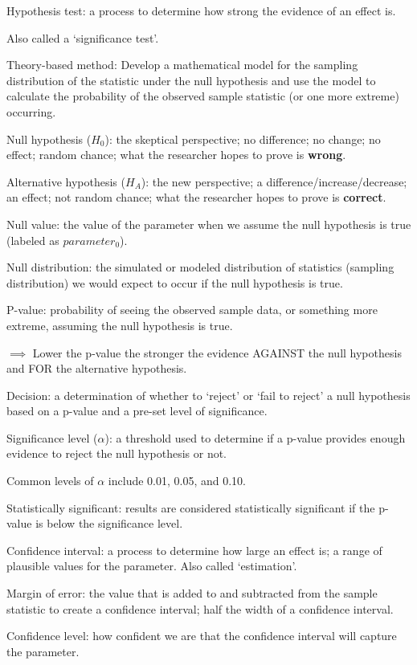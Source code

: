 \documentclass[
]{report}
\newcommand{\rgi}{\hspace{24pt}}  %
\begin{document}
Hypothesis test: a process to determine how strong the evidence of an effect is.

\rgi Also called a `significance test'.

Theory-based method: Develop a mathematical model for the sampling distribution of the statistic under the null hypothesis and use the model to calculate the probability of the observed sample statistic (or one more extreme) occurring.

Null hypothesis (\(H_0\)): the skeptical perspective; no difference; no change; no effect; random chance; what the researcher hopes to prove is \textbf{wrong}.

Alternative hypothesis (\(H_A\)): the new perspective; a difference/increase/decrease; an effect; not random chance; what the researcher hopes to prove is \textbf{correct}.

Null value: the value of the parameter when we assume the null hypothesis is true (labeled as \(parameter_0\)).

Null distribution: the simulated or modeled distribution of statistics (sampling distribution) we would expect to occur if the null hypothesis is true.

P-value: probability of seeing the observed sample data, or something more extreme, assuming the null hypothesis is true.

\(\implies\) Lower the p-value the stronger the evidence AGAINST the null hypothesis and FOR the alternative hypothesis.

Decision: a determination of whether to `reject' or `fail to reject' a null hypothesis based on a p-value and a pre-set level of significance.

Significance level (\(\alpha\)): a threshold used to determine if a p-value provides enough evidence to reject the null hypothesis or not.

\rgi Common levels of \(\alpha\) include 0.01, 0.05, and 0.10.

Statistically significant: results are considered statistically significant if the p-value is below the significance level.

Confidence interval: a process to determine how large an effect is; a range of plausible values for the parameter. Also called `estimation'.

Margin of error: the value that is added to and subtracted from the sample statistic to create a confidence interval; half the width of a confidence interval.

Confidence level: how confident we are that the confidence interval will capture the parameter.
\end{document}
